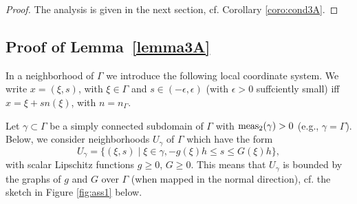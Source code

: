 \documentclass[final]{siamltex}
\begin{document}
\begin{proof}
 The analysis is given in the next section, cf. Corollary \ref{coro:cond3A}. 
\end{proof}
\subsection{Proof of Lemma~\ref{lemma3A}} \label{sectproof3A}
In a neighborhood of $\Gamma$ we introduce the following local coordinate system. We write $x=(\xi,s)$, with $\xi \in \Gamma$ and $s \in (-\epsilon,\epsilon)$ (with $\epsilon >0$ suffciently small) iff $x= \xi + s n(\xi)$, with $n=n_\Gamma$.

Let $\gamma \subset \Gamma$ be a simply connected subdomain of $\Gamma$ with ${\rm meas_2}(\gamma) >0$ (e.g., $\gamma=\Gamma$). Below, we consider neighborhoods $U_\gamma$ of $\Gamma$ which have the form
\begin{equation} \label{defU}
 U_\gamma = \{ (\xi,s) \mid \xi \in \gamma, -g(\xi)h\le s\le G(\xi)h \},
\end{equation}
with scalar Lipschitz functions $g \ge 0$, $G\ge 0$. This means that $U_\gamma$ is bounded by the graphs of $g$ and $G$ over $\Gamma$ (when mapped in the normal direction), cf. the sketch in Figure \ref{fig:ass1} below.
\end{document}
